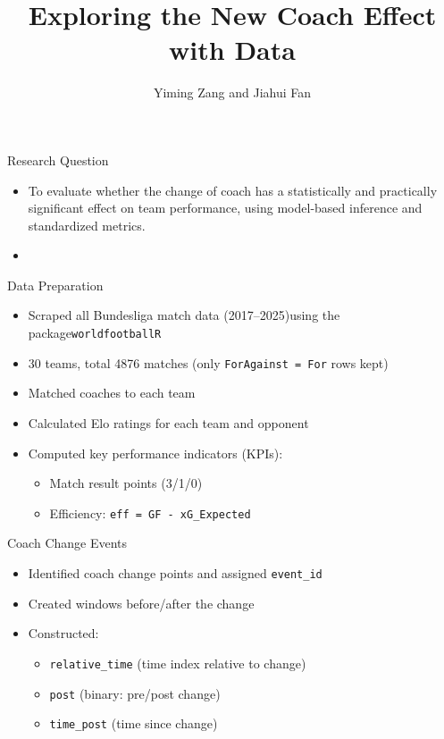 \documentclass[
  ignorenonframetext,
]{beamer}
\title{Exploring the New Coach Effect with Data}
\author{Yiming Zang and Jiahui Fan}
\date{}
\providecommand{\tightlist}{%
  \setlength{\itemsep}{0pt}\setlength{\parskip}{0pt}}\usepackage{longtable,booktabs,array}
\begin{document}
\frame{\titlepage}


\begin{frame}{Research Question}
\label{research-question}
\begin{itemize}
\item
  To evaluate whether the change of coach has a statistically and
  practically significant effect on team performance, using model-based
  inference and standardized metrics.
\item
\end{itemize}
\end{frame}

\begin{frame}[fragile]{Data Preparation}
\label{data-preparation}
\begin{itemize}
\tightlist
\item
  Scraped all Bundesliga match data (2017--2025)using the
  package\texttt{worldfootballR}
\item
  30 teams, total 4876 matches (only \texttt{ForAgainst\ =\ For} rows
  kept)
\item
  Matched coaches to each team
\item
  Calculated Elo ratings for each team and opponent
\item
  Computed key performance indicators (KPIs):

  \begin{itemize}
  \tightlist
  \item
    Match result points (3/1/0)
  \item
    Efficiency: \texttt{eff\ =\ GF\ -\ xG\_Expected}
  \end{itemize}
\end{itemize}
\end{frame}

\begin{frame}[fragile]{Coach Change Events}
\label{coach-change-events}
\begin{itemize}
\tightlist
\item
  Identified coach change points and assigned \texttt{event\_id}
\item
  Created windows before/after the change
\item
  Constructed:

  \begin{itemize}
  \tightlist
  \item
    \texttt{relative\_time} (time index relative to change)
  \item
    \texttt{post} (binary: pre/post change)
  \item
    \texttt{time\_post} (time since change)
  \end{itemize}
\end{itemize}
\end{frame}
\end{document}

